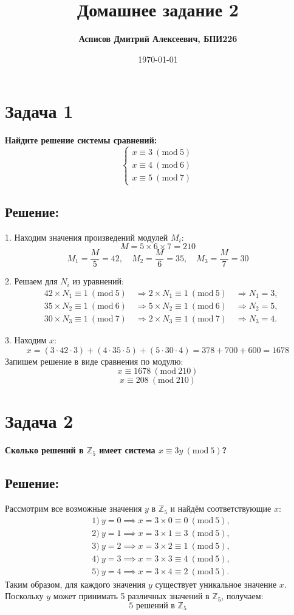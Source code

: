 \documentclass[12pt,a4paper]{article}
\author{\textbf{Асписов Дмитрий Алексеевич, БПИ226}}
\date{\today}
\title{\textbf{Домашнее задание 2}}
\newcommand{\zadacha}[2]{\section*{Задача #1} \textcolor{myblue}{\textbf{#2}}}
\begin{document}
\maketitle

\zadacha{1}{Найдите решение системы сравнений:}
\[
\begin{cases}
x \equiv 3 \ (\text{mod} \ 5) \\
x \equiv 4 \ (\text{mod} \ 6) \\
x \equiv 5 \ (\text{mod} \ 7)
\end{cases}
\]

\subsection*{Решение:}

1. Находим значения произведений модулей \(M_i\):
\[
M = 5 \times 6 \times 7 = 210
\]
\[
M_1 = \frac{M}{5} = 42, \quad M_2 = \frac{M}{6} = 35, \quad M_3 = \frac{M}{7} = 30
\]

2. Решаем для \(N_i\) из уравнений:
\[
\begin{aligned}
&42 \times N_1 \equiv 1\ (\text{mod} \ 5) \quad \Rightarrow 2 \times N_1 \equiv 1\ (\text{mod} \ 5) \quad \Rightarrow N_1 = 3, \\
&35 \times N_2 \equiv 1\ (\text{mod} \ 6) \quad \Rightarrow 5 \times N_2 \equiv 1\ (\text{mod} \ 6) \quad \Rightarrow N_2 = 5, \\
&30 \times N_3 \equiv 1\ (\text{mod} \ 7) \quad \Rightarrow 2 \times N_3 \equiv 1\ (\text{mod} \ 7) \quad \Rightarrow N_3 = 4.
\end{aligned}
\]

3. Находим \(x\):
\[
x = (3 \cdot 42 \cdot 3) + (4 \cdot 35 \cdot 5) + (5 \cdot 30 \cdot 4) = 378 + 700 + 600 = 1678
\]
Запишем решение в виде сравнения по модулю:
\[
x \equiv 1678 \ (\text{mod} \ 210)
\]
\[
\boxed{x \equiv 208\ (\text{mod}\ 210)}
\]

\zadacha{2}{Сколько решений в \(\mathbb{Z}_5\) имеет система \(x \equiv 3y \ (\text{mod} \ 5)\)?}

\subsection*{Решение:}

Рассмотрим все возможные значения \(y\) в \(\mathbb{Z}_5\) и найдём соответствующие \(x\):
\[
\begin{aligned}
&1)\ y = 0 \implies x = 3 \times 0 \equiv 0 \ (\text{mod} \ 5), \\
&2)\ y = 1 \implies x = 3 \times 1 \equiv 3 \ (\text{mod} \ 5), \\
&3)\ y = 2 \implies x = 3 \times 2 \equiv 1 \ (\text{mod} \ 5), \\
&4)\ y = 3 \implies x = 3 \times 3 \equiv 4 \ (\text{mod} \ 5), \\
&5)\ y = 4 \implies x = 3 \times 4 \equiv 2 \ (\text{mod} \ 5).
\end{aligned}
\]
Таким образом, для каждого значения \(y\) существует уникальное значение \(x\). Поскольку \(y\) может принимать 5 различных значений в \(\mathbb{Z}_5\), получаем:
\[
\boxed{5 \text{ решений в } \mathbb{Z}_5}
\]
\end{document}
